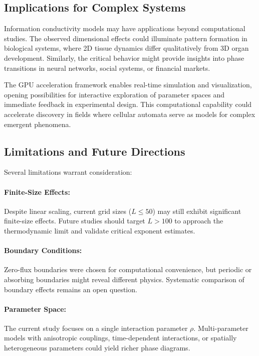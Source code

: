 \subsection{Implications for Complex Systems}

Information conductivity models may have applications beyond computational 
studies. The observed dimensional effects could illuminate pattern formation 
in biological systems, where 2D tissue dynamics differ qualitatively from 
3D organ development. Similarly, the critical behavior might provide insights 
into phase transitions in neural networks, social systems, or financial markets.

The GPU acceleration framework enables real-time simulation and visualization, 
opening possibilities for interactive exploration of parameter spaces and 
immediate feedback in experimental design. This computational capability 
could accelerate discovery in fields where cellular automata serve as 
models for complex emergent phenomena.

\subsection{Limitations and Future Directions}

Several limitations warrant consideration:

\paragraph{Finite-Size Effects:} Despite linear scaling, current grid sizes 
($L \leq 50$) may still exhibit significant finite-size effects. Future 
studies should target $L > 100$ to approach the thermodynamic limit and 
validate critical exponent estimates.

\paragraph{Boundary Conditions:} Zero-flux boundaries were chosen for 
computational convenience, but periodic or absorbing boundaries might 
reveal different physics. Systematic comparison of boundary effects 
remains an open question.

\paragraph{Parameter Space:} The current study focuses on a single interaction 
parameter $\rho$. Multi-parameter models with anisotropic couplings, 
time-dependent interactions, or spatially heterogeneous parameters 
could yield richer phase diagrams.

